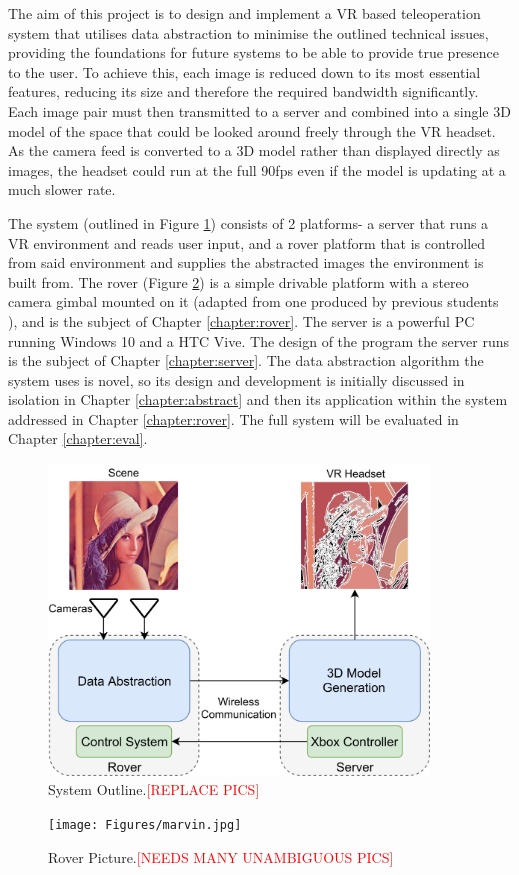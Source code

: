 The aim of this project is to design and implement a VR based teleoperation system that utilises data abstraction to minimise the outlined technical issues, providing the foundations for future systems to be able to provide true presence to the user. To achieve this, each image is reduced down to its most essential features, reducing its size and therefore the required bandwidth significantly. Each image pair must then transmitted to a server and combined into a single 3D model of the space that could be looked around freely through the VR headset. As the camera feed is converted to a 3D model rather than displayed directly as images, the headset could run at the full 90fps even if the model is updating at a much slower rate.

The system (outlined in Figure \ref{fig:outline}) consists of 2 platforms- a server that runs a VR environment and reads user input, and a rover platform that is controlled from said environment and supplies the abstracted images the environment is built from. The rover (Figure \ref{fig:marvin}) is a simple drivable platform with a stereo camera gimbal mounted on it (adapted from one produced by previous students \cite{gimble}), and is the subject of Chapter \ref{chapter:rover}. The server is a powerful PC running Windows 10 \cite{windows} and a HTC Vive. The design of the program the server runs is the subject of Chapter \ref{chapter:server}. The data abstraction algorithm the system uses is novel, so its design and development is initially discussed in isolation in Chapter \ref{chapter:abstract} and then its application within the system addressed in Chapter \ref{chapter:rover}. The full system will be evaluated in Chapter \ref{chapter:eval}.

\begin{figure}[H]
    \begin{center}
      \includegraphics[width=0.9\textwidth]{Figures/Outline.png}
      \caption[System Outline]{System Outline.\textcolor{red}{[REPLACE PICS]}}
      \label{fig:outline}
    \end{center}
\end{figure}

\begin{figure}[H]
    \begin{center}
      \texttt{[image: Figures/marvin.jpg]}
      \caption[Rover Picture]{Rover Picture.\textcolor{red}{[NEEDS MANY UNAMBIGUOUS PICS]}}
      \label{fig:marvin}
    \end{center}
\end{figure}